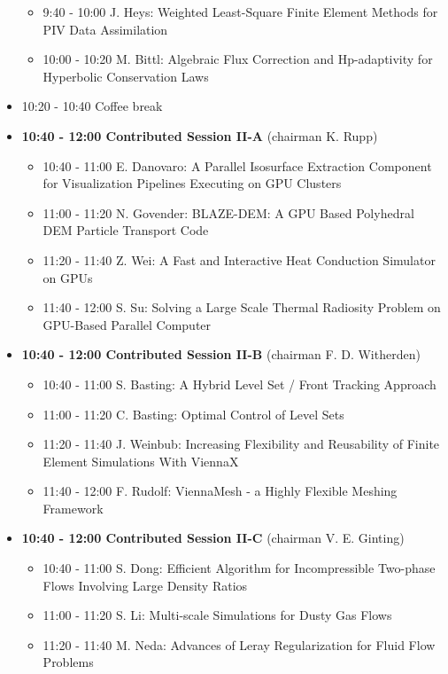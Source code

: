\documentclass[10pt, A4]{article}%
\begin{document}
\begin{itemize}
\begin{itemize}
    \item 9:40 - 10:00 {J. Heys}: {Weighted Least-Square Finite Element Methods for PIV Data Assimilation}
    \item 10:00 - 10:20 {M. Bittl}: {Algebraic Flux Correction and Hp-adaptivity for Hyperbolic Conservation Laws}
  \end{itemize}
  \item 10:20 - 10:40 Coffee break
  \item {\bf 10:40 - 12:00 Contributed Session II-A} (chairman K. Rupp) 
  \begin{itemize}
    \item 10:40 - 11:00 {E. Danovaro}: {A Parallel Isosurface Extraction Component for Visualization Pipelines Executing on GPU Clusters}
    \item 11:00 - 11:20 {N. Govender}: {BLAZE-DEM: A GPU Based Polyhedral DEM Particle Transport Code}
    \item 11:20 - 11:40 {Z. Wei}: {A Fast and Interactive Heat Conduction Simulator on GPUs}
    \item 11:40 - 12:00 {S. Su}: {Solving a Large Scale Thermal Radiosity Problem on GPU-Based Parallel Computer}
  \end{itemize}
  \item {\bf 10:40 - 12:00 Contributed Session II-B} (chairman F. D. Witherden) 
  \begin{itemize}
    \item 10:40 - 11:00 {S. Basting}: {A Hybrid Level Set / Front Tracking Approach}
    \item 11:00 - 11:20 {C. Basting}: {Optimal Control of Level Sets}
    \item 11:20 - 11:40 {J. Weinbub}: {Increasing Flexibility and Reusability of Finite Element Simulations With ViennaX}
    \item 11:40 - 12:00 {F. Rudolf}: {ViennaMesh - a Highly Flexible Meshing Framework}
  \end{itemize}
  \item {\bf 10:40 - 12:00 Contributed Session II-C} (chairman V. E. Ginting) 
  \begin{itemize}
    \item 10:40 - 11:00 {S. Dong}: {Efficient Algorithm for Incompressible Two-phase Flows Involving Large Density Ratios}
    \item 11:00 - 11:20 {S. Li}: {Multi-scale Simulations for Dusty Gas Flows}
    \item 11:20 - 11:40 {M. Neda}: {Advances of Leray Regularization for Fluid Flow Problems}

\end{itemize}
\end{itemize}
\end{document}
